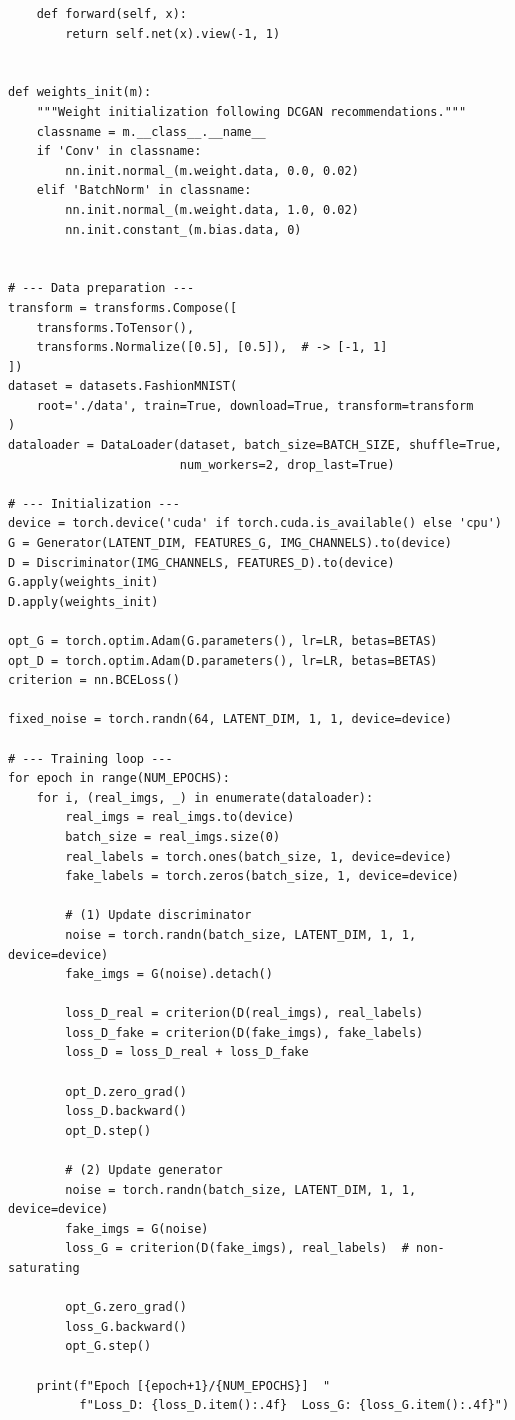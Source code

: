\begin{codeblock}[title=\textbf{Complete DCGAN with training loop}]
\begin{verbatim}
    def forward(self, x):
        return self.net(x).view(-1, 1)


def weights_init(m):
    """Weight initialization following DCGAN recommendations."""
    classname = m.__class__.__name__
    if 'Conv' in classname:
        nn.init.normal_(m.weight.data, 0.0, 0.02)
    elif 'BatchNorm' in classname:
        nn.init.normal_(m.weight.data, 1.0, 0.02)
        nn.init.constant_(m.bias.data, 0)


# --- Data preparation ---
transform = transforms.Compose([
    transforms.ToTensor(),
    transforms.Normalize([0.5], [0.5]),  # -> [-1, 1]
])
dataset = datasets.FashionMNIST(
    root='./data', train=True, download=True, transform=transform
)
dataloader = DataLoader(dataset, batch_size=BATCH_SIZE, shuffle=True,
                        num_workers=2, drop_last=True)

# --- Initialization ---
device = torch.device('cuda' if torch.cuda.is_available() else 'cpu')
G = Generator(LATENT_DIM, FEATURES_G, IMG_CHANNELS).to(device)
D = Discriminator(IMG_CHANNELS, FEATURES_D).to(device)
G.apply(weights_init)
D.apply(weights_init)

opt_G = torch.optim.Adam(G.parameters(), lr=LR, betas=BETAS)
opt_D = torch.optim.Adam(D.parameters(), lr=LR, betas=BETAS)
criterion = nn.BCELoss()

fixed_noise = torch.randn(64, LATENT_DIM, 1, 1, device=device)

# --- Training loop ---
for epoch in range(NUM_EPOCHS):
    for i, (real_imgs, _) in enumerate(dataloader):
        real_imgs = real_imgs.to(device)
        batch_size = real_imgs.size(0)
        real_labels = torch.ones(batch_size, 1, device=device)
        fake_labels = torch.zeros(batch_size, 1, device=device)

        # (1) Update discriminator
        noise = torch.randn(batch_size, LATENT_DIM, 1, 1, device=device)
        fake_imgs = G(noise).detach()

        loss_D_real = criterion(D(real_imgs), real_labels)
        loss_D_fake = criterion(D(fake_imgs), fake_labels)
        loss_D = loss_D_real + loss_D_fake

        opt_D.zero_grad()
        loss_D.backward()
        opt_D.step()

        # (2) Update generator
        noise = torch.randn(batch_size, LATENT_DIM, 1, 1, device=device)
        fake_imgs = G(noise)
        loss_G = criterion(D(fake_imgs), real_labels)  # non-saturating

        opt_G.zero_grad()
        loss_G.backward()
        opt_G.step()

    print(f"Epoch [{epoch+1}/{NUM_EPOCHS}]  "
          f"Loss_D: {loss_D.item():.4f}  Loss_G: {loss_G.item():.4f}")
\end{verbatim}
\end{codeblock}

